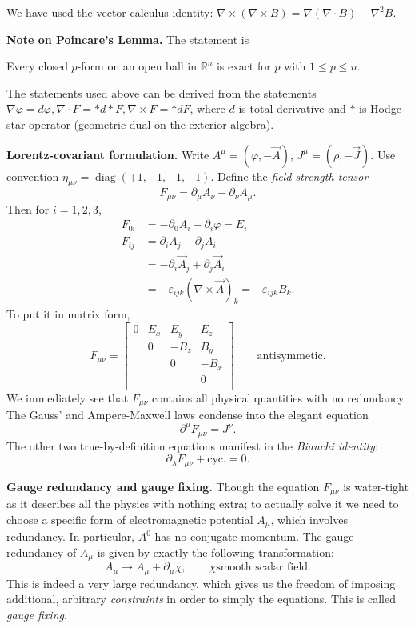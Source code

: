 We have used the vector calculus identity: $\nabla  \times (\nabla  \times B) = \nabla (\nabla \cdot B) - \nabla ^2 B$.

\textbf{Note on Poincare's Lemma.} The statement is
\begin{lemma}
	\label{lem:Poincare}
	Every closed $p$-form on an open ball in $\mathbb{R}^n$ is exact for $p$ with $1 \leq p \leq n$.
\end{lemma}
The statements used above can be derived from the statements $\nabla  \varphi = d \varphi, \nabla \cdot F = * d * F, \nabla \times F = * d F$, where $d$ is total derivative and $*$ is Hodge star operator (geometric dual on the exterior algebra).

\textbf{Lorentz-covariant formulation.}
Write $A^\mu = (\varphi, - \vec{A} )$, $J^\mu = \left( \rho, - \vec{J}  \right) $. Use convention $\eta_{\mu \nu} = \operatorname{diag} \left( +1, -1, -1, -1 \right) $. 
Define the \textit{field strength tensor}
\[
	F_{\mu \nu} = \partial_ \mu A_ \nu - \partial_\nu A_\mu
.\] 
Then for $i = 1, 2, 3$,
\begin{align*}
	F_{0 i} &= - \partial_0 A_i - \partial_i \varphi = E_i\\
	F_{i j} &= \partial_i A_j - \partial_j A_i \\
	&= - \partial_i \vec{A} _j + \partial_j \vec{A} _i \\
	&= - \varepsilon_{i j k} \left( \nabla \times \vec{A}  \right) _k = - \varepsilon_{i j k} B_k
.\end{align*}
To put it in matrix form,
\[
	F_{\mu \nu} =
	\begin{bmatrix}
		0 & E_x & E_y & E_z \\
		 & 0 & -B_z & B_y \\
		 &  & 0 & -B_x \\
		 &  &  & 0 \\
	\end{bmatrix}
\qquad \text{antisymmetic}
.\] 
We immediately see that $F_{\mu \nu}$ contains all physical quantities with no redundancy. The Gauss' and Ampere-Maxwell laws condense into the elegant equation
\[
	\partial^ \mu F_{\mu \nu} = J^\nu
.\] 
The other two true-by-definition equations manifest in the \textit{Bianchi identity}:
\[
	\partial_\lambda F_{\mu \nu} + \text{cyc.} = 0
.\]

\textbf{Gauge redundancy and gauge fixing.}
Though the equation $F_{\mu \nu}$ is water-tight as it describes all the physics with nothing extra; to actually solve it we need to choose a specific form of electromagnetic potential $A_\mu$, which involves redundancy. In particular, $A^0$ has no conjugate momentum. The gauge redundancy of $A_\mu$ is given by exactly the following transformation:
\[
	A_ \mu \to A_ \mu + \partial_ \mu \chi, \qquad \chi \text{smooth scalar field}
.\] 
This is indeed a very large redundancy, which gives us the freedom of imposing additional, arbitrary \textit{constraints} in order to simply the equations. This is called \textit{gauge fixing}.

